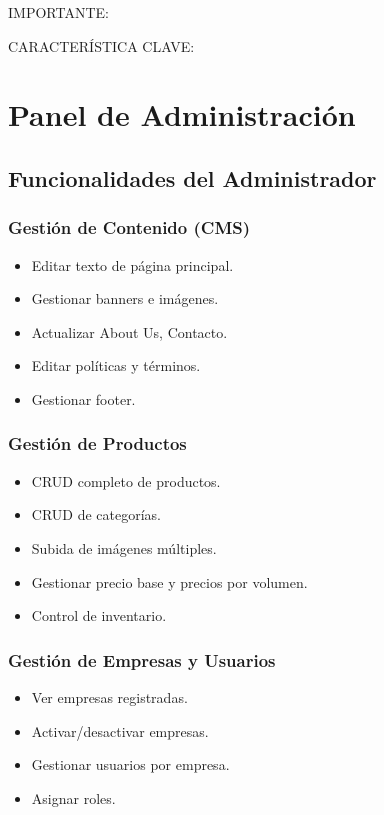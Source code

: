 \documentclass[12pt,a4paper,oneside]{book}
\begin{document}
\begin{alert}{IMPORTANTE:}
\begin{info}{CARACTERÍSTICA CLAVE:}
\chapter{Panel de Administración}
\label{cap:admin}

\section{Funcionalidades del Administrador}

\subsection{Gestión de Contenido (CMS)}
\begin{itemize}
    \item Editar texto de página principal.
    \item Gestionar banners e imágenes.
    \item Actualizar About Us, Contacto.
    \item Editar políticas y términos.
    \item Gestionar footer.
\end{itemize}

\subsection{Gestión de Productos}
\begin{itemize}
    \item CRUD completo de productos.
    \item CRUD de categorías.
    \item Subida de imágenes múltiples.
    \item Gestionar precio base y precios por volumen.
    \item Control de inventario.
\end{itemize}

\subsection{Gestión de Empresas y Usuarios}
\begin{itemize}
    \item Ver empresas registradas.
    \item Activar/desactivar empresas.
    \item Gestionar usuarios por empresa.
    \item Asignar roles.
\end{itemize}


\end{info}
\end{alert}
\end{document}
